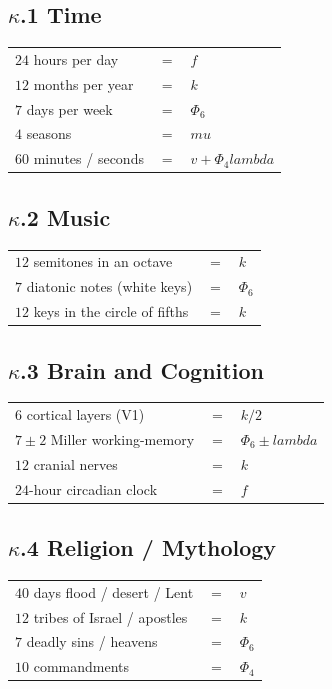 \documentclass[12pt,a4paper]{article}
\def\lambda{lambda}%
\def\mu{mu}%
\def\Phi#1{Phi#1}%
\theoremstyle{definition}
\begin{document}
\subsection*{$\kappa$.1 \quad Time}
\begin{center}
\begin{tabular}{lcl}
$24$ hours per day & $=$ & $f$ \\
$12$ months per year & $=$ & $k$ \\
$7$ days per week & $=$ & $\Phi_6$ \\
$4$ seasons & $=$ & $\mu$ \\
$60$ minutes / seconds & $=$ & $v + \Phi_4\lambda$ \\
\end{tabular}
\end{center}

\subsection*{$\kappa$.2 \quad Music}
\begin{center}
\begin{tabular}{lcl}
$12$ semitones in an octave & $=$ & $k$ \\
$7$ diatonic notes (white keys) & $=$ & $\Phi_6$ \\
$12$ keys in the circle of fifths & $=$ & $k$ \\
\end{tabular}
\end{center}

\subsection*{$\kappa$.3 \quad Brain and Cognition}
\begin{center}
\begin{tabular}{lcl}
$6$ cortical layers (V1) & $=$ & $k/2$ \\
$7\pm 2$ Miller working-memory & $=$ & $\Phi_6 \pm \lambda$ \\
$12$ cranial nerves & $=$ & $k$ \\
$24$-hour circadian clock & $=$ & $f$ \\
\end{tabular}
\end{center}

\subsection*{$\kappa$.4 \quad Religion / Mythology}
\begin{center}
\begin{tabular}{lcl}
$40$ days flood / desert / Lent & $=$ & $v$ \\
$12$ tribes of Israel / apostles & $=$ & $k$ \\
$7$ deadly sins / heavens & $=$ & $\Phi_6$ \\
$10$ commandments & $=$ & $\Phi_4$ \\
\end{tabular}
\end{center}
\end{document}

